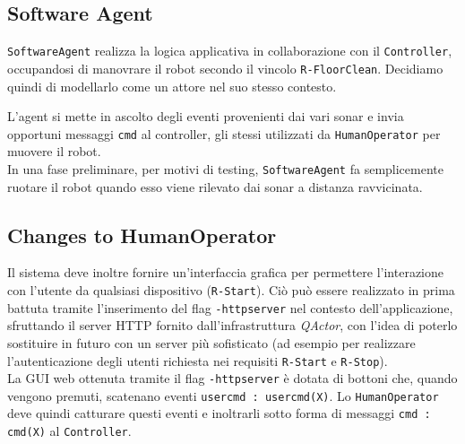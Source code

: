 \documentclass{../llncs}
\newcommand{\codescript}[1]{{\mbox{\small{\texttt{#1}}}}\xspace}
\newcommand{\code}[1]{{\color{blue}\small{\texttt{#1}}}}
\newcommand{\qa}{\textsf{\textit{QActor}}\xspace}
\newcommand{\labelssec}[1]{\label{ssec:#1}}
\begin{document}


\subsection{Software Agent}
\labelssec{swagPA}
\texttt{SoftwareAgent} realizza la logica applicativa in collaborazione con il \texttt{Controller}, occupandosi di manovrare il robot secondo il vincolo \code{R-FloorClean}. Decidiamo quindi di modellarlo come un attore nel suo stesso contesto.

L'agent si mette in ascolto degli eventi provenienti dai vari sonar e invia opportuni messaggi \codescript{cmd} al controller, gli stessi utilizzati da \texttt{HumanOperator} per muovere il robot.\\

In una fase preliminare, per motivi di testing, \texttt{SoftwareAgent} fa semplicemente ruotare il robot quando esso viene rilevato dai sonar a distanza ravvicinata.\\



\subsection{Changes to HumanOperator}
\labelssec{humanOpPA}
Il sistema deve inoltre fornire un'interfaccia grafica per permettere l'interazione con l'utente da qualsiasi dispositivo (\code{R-Start}). Ciò può essere realizzato in prima battuta tramite l'inserimento del flag \codescript{-httpserver} nel contesto dell'applicazione, sfruttando il server HTTP fornito dall'infrastruttura \qa, con l'idea di poterlo sostituire in futuro con un server più sofisticato (ad esempio per realizzare l'autenticazione degli utenti richiesta nei requisiti \code{R-Start} e \code{R-Stop}).\\



La GUI web ottenuta tramite il flag \codescript{-httpserver} è dotata di bottoni che, quando vengono premuti, scatenano eventi \codescript{usercmd : usercmd(X)}. Lo \texttt{HumanOperator} deve quindi catturare questi eventi e inoltrarli sotto forma di messaggi \codescript{cmd : cmd(X)} al \texttt{Controller}.
\end{document}

